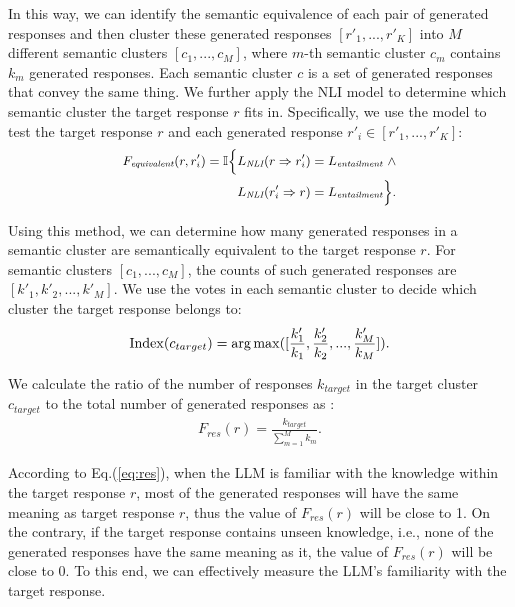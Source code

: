 In this way, we can identify the semantic equivalence of each pair of generated responses and then cluster these generated responses $[r'_1,...,r'_K]$ into $M$ different semantic clusters $[c_1,...,c_M]$, where $m$-th semantic cluster $c_m$ contains $k_m$ generated responses.
Each semantic cluster $c$ is a set of generated responses that convey the same thing.
We further apply the NLI model to determine which semantic cluster the target response $r$ fits in.
Specifically, we use the model to test the target response $r$ and each generated response $r'_i \in [r'_1,...,r'_K]$: 
\begin{align}
\small
\begin{split}
    F_{\textit{equivalent}}(r, r'_i) = \mathbb I \Bigl\{ & L_{\textit{NLI}}(r \Rightarrow r'_i) = L_{\textit{entailment}} \,\, \land \\
    & L_{\textit{NLI}}(r'_i \Rightarrow r) =L_{\textit{entailment}} \Bigr\}.
\end{split}
\end{align}


Using this method, we can determine how many generated responses in a semantic cluster are semantically equivalent to the target response $r$.
For semantic clusters $[c_1,...,c_M]$, the counts of such generated responses are $[k'_1,k'_2,...,k'_M]$.
We use the votes in each semantic cluster to decide which cluster the target response belongs to:
\begin{align}
{\rm Index}(c_{target}) = \mathop{\arg\max}([\frac{k'_1}{k_1}, \frac{k'_2}{k_2},..., \frac{k'_M}{k_M}]).
\end{align}

We calculate the ratio of the number of responses $k_{target}$ in the target cluster $c_{target}$ to the total number of generated responses as :
\begin{align}
\label{eq:res}
F_{res}(r) = \frac{k_{target}}{\sum_{m=1}^M k_m}.
\end{align}

According to Eq.(\ref{eq:res}), when the LLM is familiar with the knowledge within the target response $r$, most of the generated responses will have the same meaning as target response $r$, thus the value of $F_{res}(r)$ will be close to 1.
On the contrary, if the target response contains unseen knowledge, i.e., none of the generated responses have the same meaning as it, the value of $F_{res}(r)$ will be close to 0. 
To this end, we can effectively measure the LLM’s familiarity with the target response.


